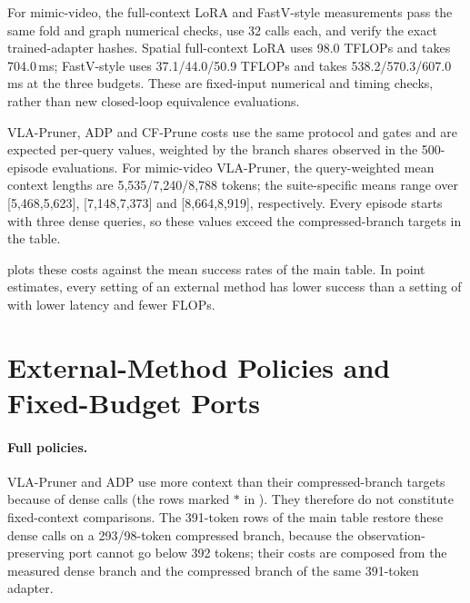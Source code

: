 For mimic-video, the full-context LoRA and FastV-style measurements pass the same fold and graph numerical checks, use 32 calls each, and verify the exact trained-adapter hashes.
Spatial full-context LoRA uses 98.0 TFLOPs and takes 704.0\,ms; FastV-style uses 37.1/44.0/50.9 TFLOPs and takes 538.2/570.3/607.0\,ms at the three budgets.
These are fixed-input numerical and timing checks, rather than new closed-loop equivalence evaluations.

VLA-Pruner, ADP and CF-Prune costs use the same protocol and gates and are expected per-query values, weighted by the branch shares observed in the 500-episode evaluations.
For mimic-video VLA-Pruner, the query-weighted mean context lengths are 5,535/7,240/8,788 tokens; the suite-specific means range over [5,468,5,623], [7,148,7,373] and [8,664,8,919], respectively.
Every episode starts with three dense queries, so these values exceed the compressed-branch targets in the table.

 plots these costs against the mean success rates of the main table.
In point estimates, every setting of an external method has lower success than a setting of \method with lower latency and fewer FLOPs.

\section{External-Method Policies and Fixed-Budget Ports}
\label{sec:supp_original_external}




\paragraph{Full policies.}
VLA-Pruner and ADP use more context than their compressed-branch targets because of dense calls (the rows marked $*$ in ).
They therefore do not constitute fixed-context comparisons.
The 391-token rows of the main table restore these dense calls on a 293/98-token compressed branch, because the observation-preserving port cannot go below 392 tokens; their costs are composed from the measured dense branch and the compressed branch of the same 391-token adapter.

